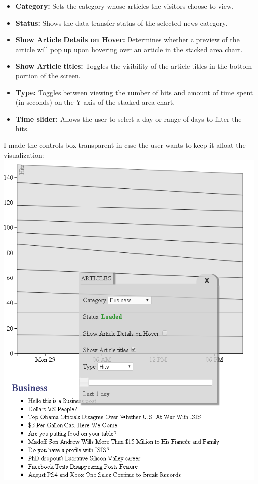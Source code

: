 \documentclass[12pt]{article}
\begin{document}
{\begin{itemize}
\item \textbf{Category: } Sets the category whose articles the visitors choose to view.
\item \textbf{Status: } Shows the data transfer status of the selected news category.
\item \textbf{Show Article Details on Hover: } Determines whether a preview of the article will pop up upon hovering over an article in the stacked area chart. 
\item \textbf{Show Article titles: } Toggles the visibility of the article titles in the bottom portion of the screen.
\item \textbf{Type: } Toggles between viewing the number of hits and amount of time spent (in seconds) on the Y axis of the stacked area chart.
\item \textbf{Time slider: } Allows the user to select a day or range of days to filter the hits.
\end{itemize}

\newpage

\noindent I made the controls box transparent in case the user wants to keep it afloat the visualization: \\

\noindent\includegraphics[scale=0.8]{img/viz_6}



}
\end{document}

